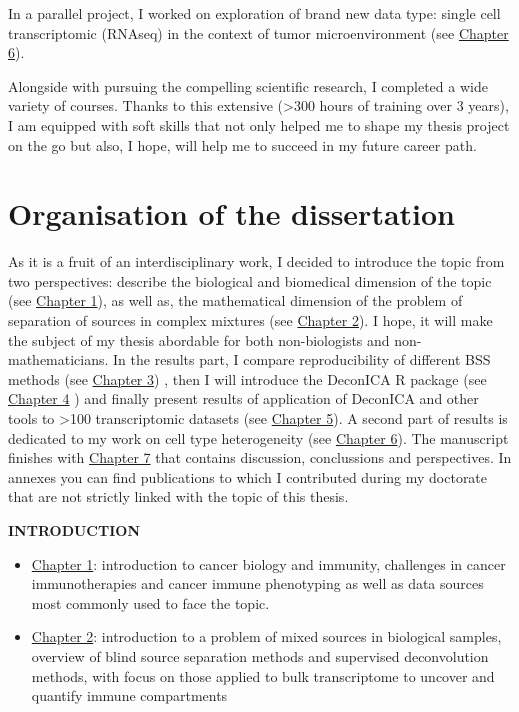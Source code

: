 \documentclass[12pt,]{book}
\theoremstyle{definition}
\theoremstyle{definition}
\theoremstyle{definition}
\theoremstyle{remark}
\begin{document}
In a parallel project, I worked on exploration of brand new data type:
single cell transcriptomic (RNAseq) in the context of tumor
microenvironment (see \protect\hyperlink{map}{Chapter 6}).

Alongside with pursuing the compelling scientific research, I completed
a wide variety of courses. Thanks to this extensive (\textgreater{}300
hours of training over 3 years), I am equipped with soft skills that not
only helped me to shape my thesis project on the go but also, I hope,
will help me to succeed in my future career path.

\hypertarget{organisation-of-the-dissertation}{%
\section*{Organisation of the
dissertation}\label{organisation-of-the-dissertation}}

As it is a fruit of an interdisciplinary work, I decided to introduce
the topic from two perspectives: describe the biological and biomedical
dimension of the topic (see \protect\hyperlink{intro}{Chapter 1}), as
well as, the mathematical dimension of the problem of separation of
sources in complex mixtures (see \protect\hyperlink{methods}{Chapter
2}). I hope, it will make the subject of my thesis abordable for both
non-biologists and non-mathematicians. In the results part, I compare
reproducibility of different BSS methods (see
\protect\hyperlink{sens}{Chapter 3}) , then I will introduce the
DeconICA R package (see \protect\hyperlink{deconica}{Chapter 4} ) and
finally present results of application of DeconICA and other tools to
\textgreater{}100 transcriptomic datasets (see
\protect\hyperlink{results}{Chapter 5}). A second part of results is
dedicated to my work on cell type heterogeneity (see
\protect\hyperlink{map}{Chapter 6}). The manuscript finishes with
\protect\hyperlink{conclusions}{Chapter 7} that contains discussion,
conclussions and perspectives. In annexes you can find publications to
which I contributed during my doctorate that are not strictly linked
with the topic of this thesis.

\textbf{INTRODUCTION}

\begin{itemize}
\item
  \protect\hyperlink{intro}{Chapter 1}: introduction to cancer biology
  and immunity, challenges in cancer immunotherapies and cancer immune
  phenotyping as well as data sources most commonly used to face the
  topic.
\item
  \protect\hyperlink{methods}{Chapter 2}: introduction to a problem of
  mixed sources in biological samples, overview of blind source
  separation methods and supervised deconvolution methods, with focus on
  those applied to bulk transcriptome to uncover and quantify immune
  compartments
\end{itemize}
\end{document}
